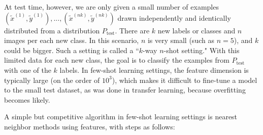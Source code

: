 At test time, however, we are only given a small number of examples $(\tilde{x}^{(1)}, \tilde{y}^{(1)}), ..., (\tilde{x}^{(nk )}, \tilde{y}^{(nk)})$ drawn independently and identically distributed from a distribution $P_{\text{test}}$. There are $k$ new labels or classes and $n$ images per each new class. In this scenario, $n$ is very small (such as $n = 5$), and $k$ could be bigger. Such a setting is called a ``$k$-way $n$-shot setting." With this limited data for each new class, the goal is to classify the examples from $P_{\text{test}}$ with one of the $k$ labels. In few-shot learning settings, the feature dimension is typically large (on the order of $10^3$), which makes it difficult to fine-tune a model to the small test dataset, as was done in transfer learning, because overfitting becomes likely.

A simple but competitive algorithm in few-shot learning settings is nearest neighbor methods using features, with steps as follows:
